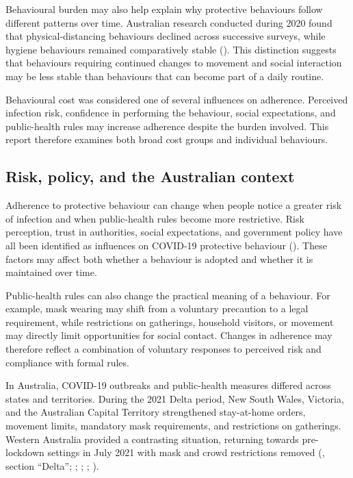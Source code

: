 \documentclass[
  12pt,
  a4paper,
]{article}
\begin{document}
Behavioural burden may also help explain why protective behaviours
follow different patterns over time. Australian research conducted
during 2020 found that physical-distancing behaviours declined across
successive surveys, while hygiene behaviours remained comparatively
stable (). This distinction suggests that behaviours
requiring continued changes to movement and social interaction may be
less stable than behaviours that can become part of a daily routine.

Behavioural cost was considered one of several influences on adherence.
Perceived infection risk, confidence in performing the behaviour, social
expectations, and public-health rules may increase adherence despite the
burden involved. This report therefore examines both broad cost groups
and individual behaviours.

\subsection{Risk, policy, and the Australian context}\label{risk-policy-and-the-australian-context}

Adherence to protective behaviour can change when people notice a
greater risk of infection and when public-health rules become more
restrictive. Risk perception, trust in authorities, social expectations,
and government policy have all been identified as influences on COVID-19
protective behaviour (). These factors may affect
both whether a behaviour is adopted and whether it is maintained over
time.

Public-health rules can also change the practical meaning of a
behaviour. For example, mask wearing may shift from a voluntary
precaution to a legal requirement, while restrictions on gatherings,
household visitors, or movement may directly limit opportunities for
social contact. Changes in adherence may therefore reflect a combination
of voluntary responses to perceived risk and compliance with formal
rules.

In Australia, COVID-19 outbreaks and public-health measures differed
across states and territories. During the 2021 Delta period, New South
Wales, Victoria, and the Australian Capital Territory strengthened
stay-at-home orders, movement limits, mandatory mask requirements, and
restrictions on gatherings. Western Australia provided a contrasting
situation, returning towards pre-lockdown settings in July 2021 with
mask and crowd restrictions removed (, section ``Delta''; ; ; ; ).
\end{document}
